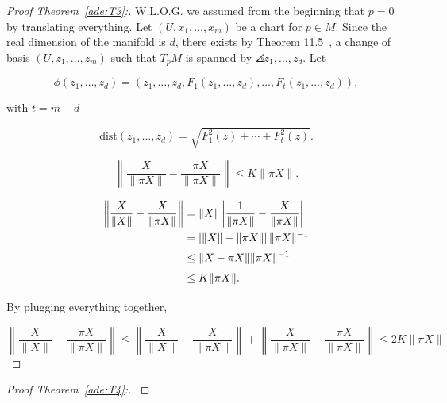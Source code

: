 \begin{proof}[Proof Theorem~\ref{ade:T3}:]\label{ade:T3P}
  W.L.O.G. we assumed from the beginning that $p=0$ by translating everything. Let $(U, x_1, \ldots, x_m)$ be a chart for $p \in M$. Since the real dimension of the manifold is $d$, there exists by Theorem 11.5~\cite{tu2011manifolds}, a change of basis $(U, z_1, \ldots, z_m)$ such that $T_p M$ is spanned by $\angles{z_1,\ldots, z_d}$. Let

  \[ \phi(z_1, \ldots, z_d) = (z_1,\ldots, z_d, F_1(z_1,\ldots, z_d),\ldots, F_{t}(z_1,\ldots, z_d)),\]
  
  with $t = m-d$

  \[ \text{dist}(z_1, \ldots, z_d) = \sqrt{F_1^2(z)+ \cdots + F_t^2(z)}. \]
  
  \[ \left\| \frac{X}{\|\pi X\|} - \frac{\pi X}{\|\pi X\|} \right\| \leq K\|\pi X\|. \]
  
  \[ \everymath{\displaystyle}\arraycolsep=1.4pt\def\arraystretch{1.5}
  \begin{array}{rcl}
    \left\| \frac{X}{\|X\|} - \frac{X}{\|\pi X\|} \right\| & = & \|X\| \left| \frac{1}{\|\pi X\|} - \frac{X}{\|\pi X\|} \right|\\
    & = & \left|\|X\|- \|\pi X\|\right| \|\pi X\|^{-1}\\
    & \leq & \|X-\pi X\|\|\pi X\|^{-1}\\
    & \leq & K \|\pi X\|.
  \end{array}
  \] 

  By plugging everything together,

  \[ \left\|\frac{X}{\|X\|} - \frac{\pi X}{\|\pi X\|}\right\| \leq  {\left\| \frac{X}{\|X\|} - \frac{X}{\|\pi X\|} \right\|} + { \left\| \frac{X}{\|\pi X\|} - \frac{\pi X}{\|\pi X\|} \right\|} \leq 2 K \|\pi X\|\] 
  
\end{proof}

\begin{proof}[Proof Theorem~\ref{ade:T4}:]\label{ade:T4P}
\end{proof}